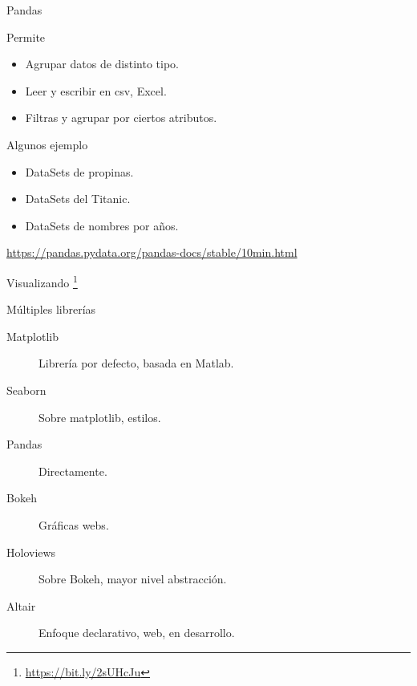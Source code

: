 \documentclass[bigger,unknownkeysallowed]{beamer}
\begin{document}
\begin{frame}[label={sec:orgcaf244e}]{Pandas}
\begin{block}{Permite}
\begin{itemize}
\item Agrupar datos de distinto tipo.

\item Leer y escribir en csv, Excel.

\item Filtras y agrupar por ciertos atributos.
\end{itemize}
\end{block}

\begin{exampleblock}{Algunos ejemplo}
\begin{itemize}
\item DataSets de propinas.

\item DataSets del Titanic.

\item DataSets de nombres por años.
\end{itemize}
\end{exampleblock}

{\color{blue}\href{https://pandas.pydata.org/pandas-docs/stable/10min.html}{https://pandas.pydata.org/pandas-docs/stable/10min.html}}
\end{frame}

\begin{frame}[label={sec:org0ba850b}]{Visualizando \footnote{\url{https://bit.ly/2sUHcJu}}}
\begin{block}{Múltiples librerías}
\begin{description}
\item[{Matplotlib}] Librería por defecto, basada en Matlab.

\item[{Seaborn}] Sobre matplotlib, estilos.

\item[{Pandas}] Directamente.

\item[{Bokeh}] Gráficas webs.

\item[{Holoviews}] Sobre Bokeh, mayor nivel abstracción.

\item[{Altair}] Enfoque declarativo, web, en desarrollo.
\end{description}
\end{block}
\end{frame}
\end{document}
